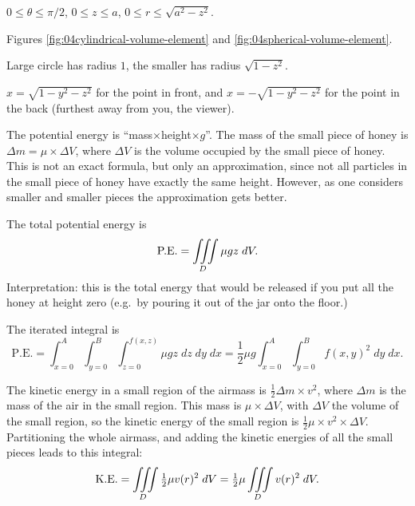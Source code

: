 $0\le\theta\le\pi/2$, $0\le z\le a$, $0\le r\le \sqrt{a^2-z^2}$.
\bigskip

\item[{\bfseries(VI7.3)}]

Figures \ref{fig:04cylindrical-volume-element} and
\ref{fig:04spherical-volume-element}.
\bigskip

\item[{\bfseries(VI7.4a)}]

Large circle has radius $1$, the smaller has radius $\sqrt{1-z^2}$.
\bigskip

\item[{\bfseries(VI7.4b)}]

$x=\sqrt{1-y^2-z^2}$ for the point in front, and $x=-\sqrt{1-y^2-z^2}$
for the point in the back (furthest away from you, the viewer).
\bigskip

\item[{\bfseries(VI7.5a)}]

The potential energy is ``mass$\times$height$\times g$''.  The mass of
the small piece of honey is $\Delta m = \mu\times \Delta V$, where
$\Delta V$ is the volume occupied by the small piece of honey.  This
is not an exact formula, but only an approximation, since not all
particles in the small piece of honey have exactly the same height.
However, as one considers smaller and smaller pieces the approximation
gets better.
\bigskip

\item[{\bfseries(VI7.5b)}]

The total potential energy is
\[
\text{P.E.} = \iiint\limits _D \mu g z \; dV.
\]
Interpretation: this is the total energy that would be released if you
put all the honey at height zero (e.g.\ by pouring it out of the jar
onto the floor.)
\bigskip

\item[{\bfseries(VI7.5c)}]

The iterated integral is
\[
\text{P.E.} =
\int_{x=0}^A \int_{y=0}^B \int_{z=0}^{f(x, z)} \mu g z \; dz\; dy\;
dx
=
\frac12 \mu g
\int_{x=0}^A \int_{y=0}^B f(x, y)^2 \; dy\; dx.
\]
\bigskip

\item[{\bfseries(VI7.6a)}]

The kinetic energy in a small region of the airmass is $\frac12 \Delta
m \times v^2$, where $\Delta m$ is the mass of the air in the small
region.  This mass is $\mu\times \Delta V$, with $\Delta V$ the
volume of the small region, so the kinetic energy of the small region
is $\frac 12 \mu \times v^2\times\Delta V$.  Partitioning the
whole airmass, and adding the kinetic energies of all the small pieces
leads to this integral:
\[
\text{K.E.} = \iiint\limits_D \tfrac12\mu v(r)^2\; dV
= \tfrac12\mu \iiint\limits_D v(r)^2\; dV
.\]
\bigskip

